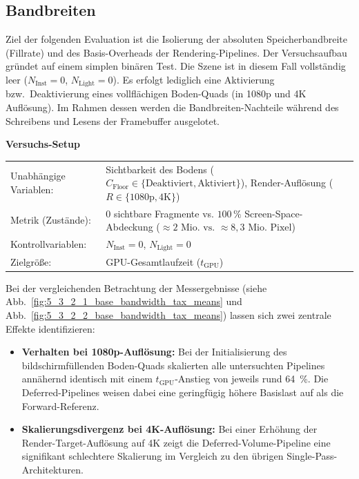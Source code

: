 \subsection{{Bandbreiten}}
\label{subsec:050302_bandwidth_eval}

Ziel der folgenden Evaluation ist die Isolierung der absoluten Speicherbandbreite (Fillrate) und des Basis-Overheads der
Rendering-Pipelines.
Der Versuchsaufbau gründet auf einem simplen binären Test.
Die Szene ist in diesem Fall vollständig leer ($N_{\text{Inst}} = 0$, $N_{\text{Light}} = 0$).
Es erfolgt lediglich eine Aktivierung bzw.\ Deaktivierung eines vollflächigen Boden-Quads (in 1080p und 4K Auflösung).
Im Rahmen dessen werden die Bandbreiten-Nachteile während des Schreibens und Lesens der Framebuffer
ausgelotet.

\begin{center}
    \small
    \colorbox{gray!5}{\parbox{0.95\textwidth}{
        \centering
        \vspace{2mm}
        {\sffamily\bfseries Versuchs-Setup} \\[1.5ex]
        \begin{tabularx}{0.9\textwidth}{>{\sffamily}l X}
            Unabhängige Variablen:   & Sichtbarkeit des Bodens ($C_{\text{Floor}} \in \{\text{Deaktiviert},
            \text{Aktiviert}\}$), Render-Auflösung ($R \in \{1080\text{p}, 4\text{K}\}$) \\
            Metrik (Zustände):       & 0 sichtbare Fragmente vs. $100\,\%$ Screen-Space-Abdeckung
            ($\approx 2\text{ Mio. vs. } \approx 8{,}3\text{ Mio. Pixel}$) \\
            Kontrollvariablen:       & $N_{\text{Inst}} = 0$, $N_{\text{Light}} = 0$ \\
            Zielgröße:               & \ac{GPU}-Gesamtlaufzeit ($t_{\text{GPU}}$)
        \end{tabularx}
        \vspace{2mm}
    }}
\end{center}

Bei der vergleichenden Betrachtung der Messergebnisse (siehe Abb.~\ref{fig:5_3_2_1_base_bandwidth_tax_means} und
Abb.~\ref{fig:5_3_2_2_base_bandwidth_tax_means}) lassen sich zwei zentrale Effekte identifizieren:

\begin{itemize}
    \item \textbf{Verhalten bei 1080p-Auflösung:} Bei der Initialisierung des bildschirmfüllenden Boden-Quads skalierten
    alle untersuchten Pipelines annähernd identisch mit einem $t_{\text{GPU}}$-Anstieg von jeweils rund
    \qty{64}{\percent}.
    Die Deferred-Pipelines weisen dabei eine geringfügig höhere Basislast auf als die Forward-Referenz.
    \item \textbf{Skalierungsdivergenz bei 4K-Auflösung:} Bei einer Erhöhung der Render-Target-Auflösung auf 4K zeigt
    die Deferred-Volume-Pipeline eine signifikant schlechtere Skalierung im Vergleich zu den übrigen
    Single-Pass-Architekturen.
\end{itemize}

